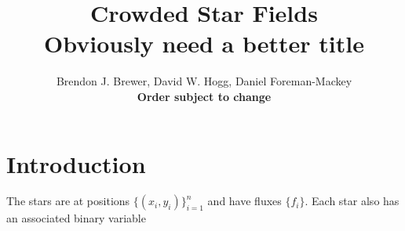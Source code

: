 \documentclass[letterpaper, 11pt]{article}
\title{Crowded Star Fields \\
\bf{Obviously need a better title}}
\author{Brendon J. Brewer, David W. Hogg, Daniel Foreman-Mackey \\
\bf{Order subject to change}}
\begin{document}
\maketitle

\section{Introduction}

The stars are at positions $\{(x_i, y_i)\}_{i=1}^n$ and have fluxes $\{f_i\}$.
Each star also has an associated binary variable 


\begin{thebibliography}{99}
\end{thebibliography}
\end{document}
